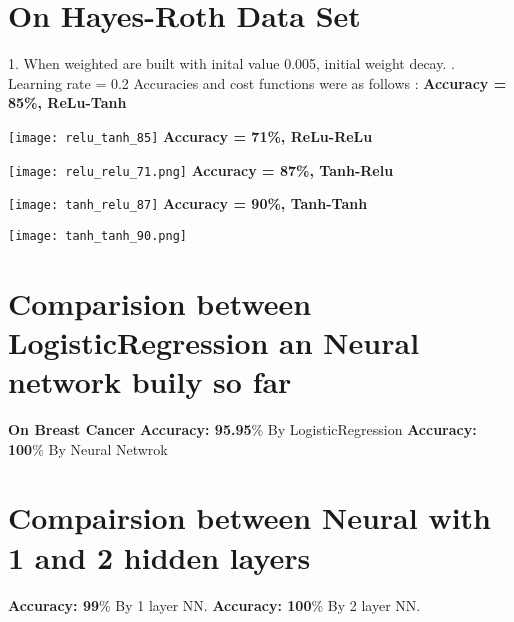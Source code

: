 \documentclass[a4paper,12pt]{article}
\begin{document}
    
    
    
    
    
    
    
    
    
    \section*{On Hayes-Roth Data Set}
    1. When weighted are built with inital value 0.005, initial weight decay.
    \newline{}. Learning rate = 0.2
    \newline\newline
    Accuracies and cost functions were as follows : 
    \newline\newline
    \textbf{Accuracy = 85\%, ReLu-Tanh}
    \newline\newline
    \graphicspath{ {./images/} }
    \texttt{[image: relu\_tanh\_85]}
    \newline\newline\newline
    \textbf{Accuracy = 71\%, ReLu-ReLu}
    \newline\newline
    \graphicspath{ {./images/} }
    \texttt{[image: relu\_relu\_71.png]}
    \newline
    \newline\newline\newline
    \textbf{Accuracy = 87\%, Tanh-Relu}
    \newline\newline
    \graphicspath{ {./images/} }
    \texttt{[image: tanh\_relu\_87]}
    \newline
    \newline\newline\newpage
    \textbf{Accuracy = 90\%, Tanh-Tanh}
    \newline\newline\newlinw
    \graphicspath{ {./images/} }
    \texttt{[image: tanh\_tanh\_90.png]}
    \newline\newline
    \section*{Comparision between LogisticRegression an Neural network buily so far}
    \textbf{On Breast Cancer}
    \newline\newline
    \textbf{Accuracy: 95.95}\% By LogisticRegression 
    \newline\newline
    \textbf{Accuracy: 100}\% By Neural Netwrok 
    \newline
    \section*{Compairsion between Neural with 1 and 2 hidden layers}
    \textbf{Accuracy: 99}\% By 1 layer NN.
    \newline\newline
    \textbf{Accuracy: 100}\% By 2 layer NN.
\end{document}
